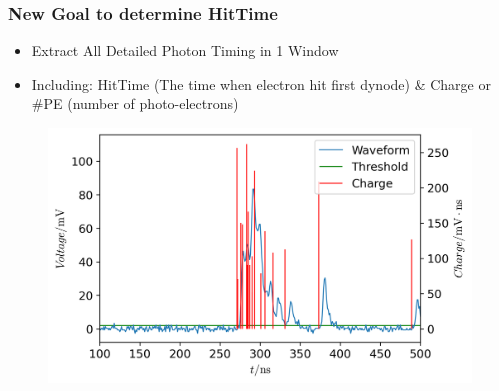 \documentclass{beamer}
\begin{document}
\begin{frame}
\frametitle{New Goal to determine HitTime}
\begin{itemize}
    \item Extract All Detailed Photon Timing in 1 Window
    \item Including: HitTime (The time when electron hit first dynode) \& Charge or \#PE (number of photo-electrons)
\end{itemize}
\begin{figure}
    \centering
    \includegraphics[width=0.8\linewidth]{img/goal.png}
\end{figure}
\end{frame}
\end{document}
